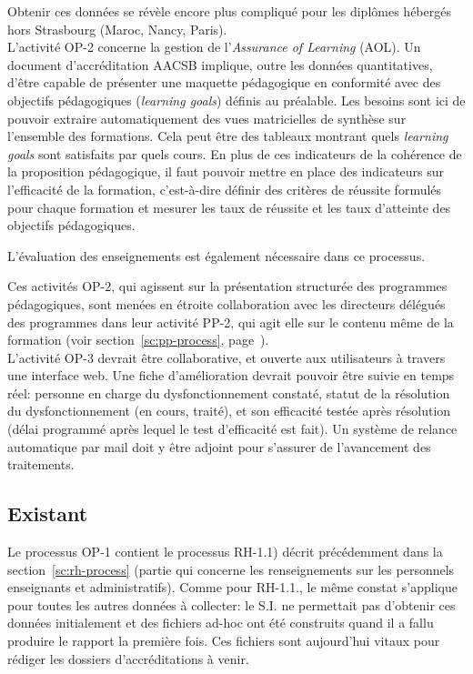 \documentclass{book}
\begin{document}
Obtenir ces données se révèle encore plus compliqué pour les diplômes hébergés
hors Strasbourg (Maroc, Nancy, Paris).\\


L'activité OP-2 concerne la gestion de l'\emph{Assurance of Learning} (AOL).
Un document d'accréditation AACSB implique, outre les données quantitatives,
d'être capable de présenter une maquette pédagogique en conformité avec des
objectifs pédagogiques (\emph{learning goals}) définis au préalable. 
Les besoins sont ici de pouvoir extraire automatiquement des vues matricielles
de synthèse sur l'ensemble des formations. Cela peut être des tableaux montrant
quels \emph{learning goals} sont satisfaits par quels cours. 
En plus de ces indicateurs de la cohérence de la proposition pédagogique, il
faut pouvoir mettre en place des indicateurs sur l'efficacité de la formation,
c'est-à-dire définir des critères de réussite formulés pour chaque formation
et mesurer les taux de réussite et les taux d'atteinte des objectifs
pédagogiques.

L'évaluation des enseignements est également nécessaire dans ce processus.

Ces activités OP-2, qui agissent sur la présentation structurée des 
programmes pédagogiques, sont menées en étroite collaboration avec les directeurs
délégués des programmes dans leur activité PP-2, qui agit elle sur le contenu
même de la formation (voir section~\ref{sc:pp-process}, page~\pageref{sc:pp-process}).
\\

L'activité OP-3 devrait être collaborative, et ouverte aux utilisateurs à 
travers une interface web. Une fiche d'amélioration devrait pouvoir
être suivie en temps réel: personne en charge du dysfonctionnement constaté, 
statut de la résolution du dysfonctionnement (en cours, traité), et son 
efficacité testée après résolution (délai programmé après 
lequel le test d'efficacité est fait). Un système de relance automatique
par mail doit y être adjoint pour s'assurer de l'avancement des traitements.



\subsection{Existant}

Le processus OP-1 contient le processus RH-1.1) décrit précédemment dans la 
section~\ref{sc:rh-process} (partie qui concerne les renseignements sur les
personnels enseignants et administratifs). Comme pour RH-1.1., le même constat 
s'applique pour toutes les autres données à collecter: le S.I. ne permettait pas 
d'obtenir ces données initialement et des fichiers ad-hoc ont été construits quand 
il a fallu produire le rapport la première fois. Ces fichiers sont aujourd'hui vitaux pour
rédiger les dossiers d'accréditations à venir.\\
\end{document}

